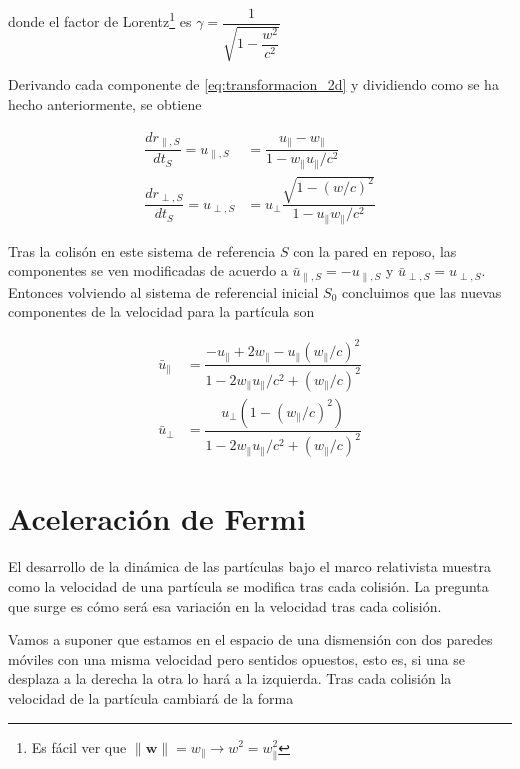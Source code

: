 donde el factor de Lorentz\footnote{Es fácil ver que \( \lVert \mathbf{w} \rVert = w_\parallel \rightarrow w^2 = w_\parallel^2 \)} es \( \gamma = \dfrac{1}{\sqrt{1 - \dfrac{w^2}{c^2}}} \)

\vspace{6mm}

Derivando cada componente de \ref{eq:transformacion_2d} y dividiendo como se ha hecho anteriormente, se obtiene

\begin{align}
    \dfrac{dr_{\parallel, S}}{dt_S} = u_{\parallel,S} &= \dfrac{u_\parallel - w_\parallel}{1 - w_\parallel u_\parallel / c^2} \label{eq:velocity_change1}\\[2mm]
    \dfrac{dr_{\perp, S}}{dt_S} = u_{\perp,S} &= u_\perp\dfrac{\sqrt{1 - {(w/c)}^2}}{1 - u_\parallel w_\parallel / c^2} \label{eq:velocity_change2}
\end{align}

Tras la colisón en este sistema de referencia \( S \) con la pared en reposo, las componentes se ven modificadas de acuerdo a \( \bar{u}_{\parallel, S} = -u_{\parallel, S} \) y \( \bar{u}_{\perp, S} = u_{\perp, S} \). Entonces volviendo al sistema de referencial inicial \( S_0 \) concluimos que las nuevas componentes de la velocidad para la partícula son

\begin{align}
    \bar{u}_\parallel &= \dfrac{-u_\parallel + 2w_\parallel - u_\parallel(w_\parallel/c)^2}{1 - 2w_\parallel u_\parallel / c^2 + (w_\parallel/c)^2} \label{eq:velocidad_paralela}\\[2mm]
    \bar{u}_\perp &= \dfrac{u_\perp\left(1 - (w_\parallel/c)^2\right)}{1 - 2w_\parallel u_\parallel / c^2 + (w_\parallel/c)^2}\label{eq:velocidad_perpendicular}
\end{align}

\section{Aceleración de Fermi}

El desarrollo de la dinámica de las partículas bajo el marco relativista muestra como la velocidad de una partícula se modifica tras cada colisión. La pregunta que surge es cómo será esa variación en la velocidad tras cada colisión.  

\vspace{3mm}

Vamos a suponer que estamos en el espacio de una dismensión con dos paredes móviles con una misma velocidad pero sentidos opuestos, esto es, si una se desplaza a la derecha la otra lo hará a la izquierda. Tras cada colisión la velocidad de la partícula cambiará de la forma

